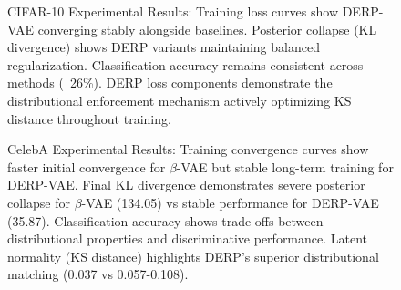 \documentclass[11pt]{article}
\begin{document}
\begin{figure}[ht]
\centering
\caption{CIFAR-10 Experimental Results: Training loss curves show DERP-VAE converging stably alongside baselines. Posterior collapse (KL divergence) shows DERP variants maintaining balanced regularization. Classification accuracy remains consistent across methods (~26\%). DERP loss components demonstrate the distributional enforcement mechanism actively optimizing KS distance throughout training.}
\label{fig:cifar_results}
\end{figure}

\begin{figure}[ht]
\centering
\caption{CelebA Experimental Results: Training convergence curves show faster initial convergence for $\beta$-VAE but stable long-term training for DERP-VAE. Final KL divergence demonstrates severe posterior collapse for $\beta$-VAE (134.05) vs stable performance for DERP-VAE (35.87). Classification accuracy shows trade-offs between distributional properties and discriminative performance. Latent normality (KS distance) highlights DERP's superior distributional matching (0.037 vs 0.057-0.108).}
\label{fig:celeba_results}
\end{figure}
\end{document}
